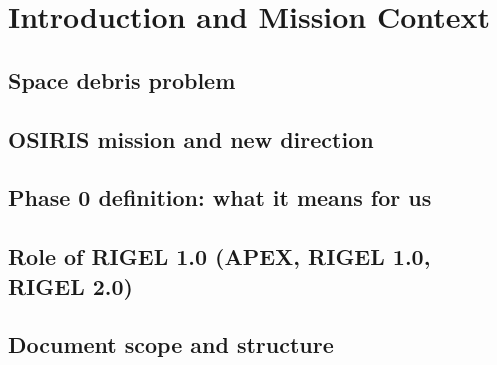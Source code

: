 \chapter{Introduction and Mission Context}
\label{ch:introduction}
\section{Space debris problem}

\section{OSIRIS mission and new direction}

\section{Phase 0 definition: what it means for us}

\section{Role of RIGEL 1.0 (APEX, RIGEL 1.0, RIGEL 2.0)}

\section{Document scope and structure}
